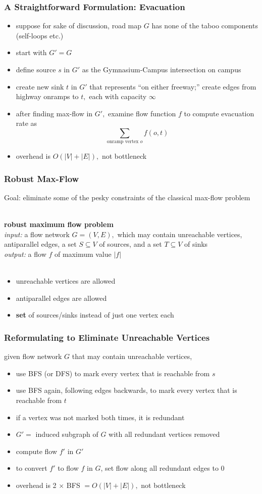 \documentclass[10pt,aspectratio=169]{beamer}
\newcommand{\stanza}{ \\~\ }
\begin{document}
\begin{frame} \frametitle{A Straightforward Formulation: Evacuation}
\begin{itemize}
  \item suppose for sake of discussion, road map $G$ has none of the taboo components (self-loops etc.)
  \item start with $G'=G$
  \item define source $s$ in $G'$ as the Gymnasium-Campus intersection on campus
  \item create new sink $t$ in $G'$ that represents ``on either freeway;''
    create edges from highway onramps to $t,$ each with capacity $\infty$
  \item after finding max-flow in $G',$ examine flow function $f$ to compute
    evacuation rate as
    \[ \sum_{\text{onramp vertex }o} f(o, t) \]
  \item overhead is $O(|V|+|E|),$ not bottleneck
\end{itemize}
\end{frame}

\begin{frame} \frametitle{Robust Max-Flow}
Goal: eliminate some of the pesky constraints of the classical max-flow problem
\stanza

\textbf{robust maximum flow problem} \\
\emph{input:} a flow network $G=(V,E),$ which may contain unreachable vertices,
antiparallel edges, a set $S \subseteq V$ of sources, and a set $T \subseteq V$
  of sinks\\
\emph{output:} a flow $f$ of maximum value $|f|$ \stanza
\vspace{.5cm}
\begin{itemize}
  \item unreachable vertices are allowed
  \item antiparallel edges are allowed
  \item \textbf{set} of sources/sinks instead of just one vertex each
\end{itemize}
\end{frame}

\begin{frame} \frametitle{Reformulating to Eliminate Unreachable Vertices}
given flow network $G$ that may contain unreachable vertices,
\begin{itemize}
  \item use BFS (or DFS) to mark every vertex that is reachable from $s$
  \item use BFS again, following edges backwards, to mark every vertex that is reachable from $t$
  \item if a vertex was not marked both times, it is redundant
  \item $G' = $ induced subgraph of $G$ with all redundant vertices removed
  \item compute flow $f'$ in $G'$
  \item to convert $f'$ to flow $f$ in $G$, set flow along all redundant edges to 0
  \item overhead is 2 $\times$ BFS $= O(|V|+|E|),$ not bottleneck
\end{itemize}
\end{frame}
\end{document}

